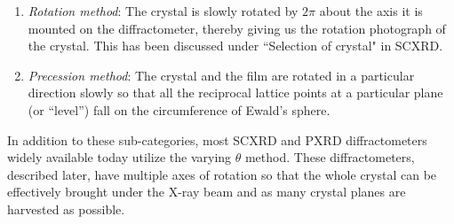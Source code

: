 \begin{itemize}
\begin{enumerate}
		    \item \textit{Rotation method}: The crystal is slowly rotated by $2\pi$ about the axis it is mounted on the diffractometer, thereby giving us the rotation photograph of the crystal. This has been discussed under ``Selection of crystal" in SCXRD.
		    
		    \item \textit{Precession method}: The crystal and the film are rotated in a particular direction slowly so that all the reciprocal lattice points at a particular plane (or ``level'') fall on the circumference of Ewald's sphere.
		    
		\end{enumerate}
		
	In addition to these sub-categories, most SCXRD and PXRD diffractometers widely available today utilize the varying $\theta$ method. These diffractometers, described later, have multiple axes of rotation so that the whole crystal can be effectively brought under the X-ray beam and as many crystal planes are harvested as possible.
	    
	\end{itemize}